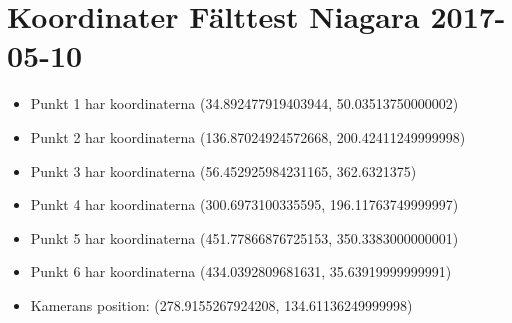 \documentclass[11pt]{article}
\author{arvid}
\date{\today}
\title{}
\begin{document}
\tableofcontents

\section{Koordinater Fälttest Niagara 2017-05-10}
\label{sec:org589221e}
\begin{itemize}
\item Punkt 1 har koordinaterna (34.892477919403944, 50.03513750000002)
\item Punkt 2 har koordinaterna (136.87024924572668, 200.42411249999998)
\item Punkt 3 har koordinaterna (56.452925984231165, 362.6321375)
\item Punkt 4 har koordinaterna (300.6973100335595, 196.11763749999997)
\item Punkt 5 har koordinaterna (451.77866876725153, 350.3383000000001)
\item Punkt 6 har koordinaterna (434.0392809681631, 35.63919999999991)
\item Kamerans position: (278.9155267924208, 134.61136249999998)
\end{itemize}
\end{document}
